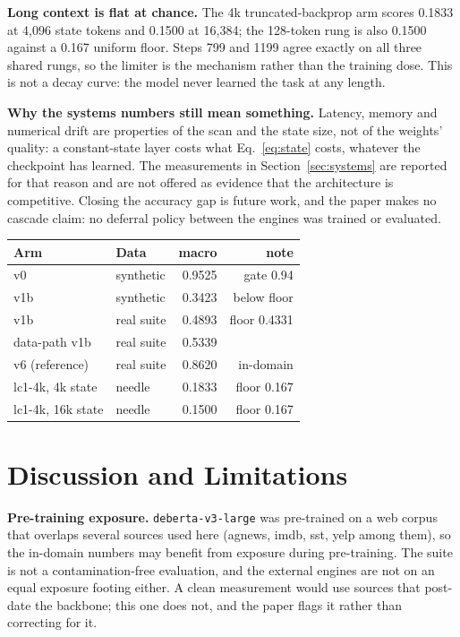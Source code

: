 \textbf{Long context is flat at chance.}
The 4k truncated-backprop arm scores 0.1833 at 4{,}096 state tokens and 0.1500 at 16{,}384; the
128-token rung is also 0.1500 against a 0.167 uniform floor. Steps 799 and 1199 agree exactly on all
three shared rungs, so the limiter is the mechanism rather than the training dose. This is not a
decay curve: the model never learned the task at any length.

\textbf{Why the systems numbers still mean something.}
Latency, memory and numerical drift are properties of the scan and the state size, not of the
weights' quality: a constant-state layer costs what Eq.~\eqref{eq:state} costs, whatever the
checkpoint has learned. The measurements in Section~\ref{sec:systems} are reported for that reason
and are not offered as evidence that the architecture is competitive. Closing the accuracy gap is
future work, and the paper makes no cascade claim: no deferral policy between the engines was
trained or evaluated.

\begin{widetable}
\centering
\footnotesize
\caption{The small-engine accuracy diagnostics. Synthetic and real columns are different suites.
These rows bound the streaming prototype; they are not comparison arms.}
\label{tab:diagnostics}
\begin{tabular}{llrr}
\toprule
Arm & Data & macro & note \\
\midrule
v0 & synthetic & 0.9525 & gate 0.94 \\
v1b & synthetic & 0.3423 & below floor \\
v1b & real suite & 0.4893 & floor 0.4331 \\
data-path v1b & real suite & 0.5339 & \\
v6 (reference) & real suite & 0.8620 & in-domain \\
lc1-4k, 4k state & needle & 0.1833 & floor 0.167 \\
lc1-4k, 16k state & needle & 0.1500 & floor 0.167 \\
\bottomrule
\end{tabular}
\end{widetable}

\section{Discussion and Limitations}
\label{sec:limitations}

\textbf{Pre-training exposure.}
\texttt{deberta-v3-large} was pre-trained on a web corpus that overlaps several sources used here
(agnews, imdb, sst, yelp among them), so the in-domain numbers may benefit from exposure during
pre-training. The suite is not a contamination-free evaluation, and the external engines are not on
an equal exposure footing either. A clean measurement would use sources that post-date the backbone;
this one does not, and the paper flags it rather than correcting for it.

